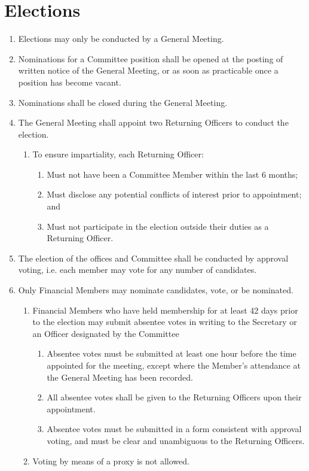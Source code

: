 \documentclass[a4paper]{article}
\begin{document}
\section{Elections} \label{sec:elections}
\begin{enumerate}
    \item Elections may only be conducted by a General Meeting.
    \item Nominations for a Committee position shall be opened at the posting of written notice of the General Meeting, or as soon as practicable once a position has become vacant.
    \item Nominations shall be closed during the General Meeting.
    \item The General Meeting shall appoint two Returning Officers to conduct the election.
    \begin{enumerate}
        \item To ensure impartiality, each Returning Officer:
        \begin{enumerate}
            \item Must not have been a Committee Member within the last 6 months;
            \item Must disclose any potential conflicts of interest prior to appointment; and
            \item Must not participate in the election outside their duties as a Returning Officer.
        \end{enumerate}
    \end{enumerate}
    \item The election of the offices and Committee shall be conducted by approval voting, i.e. each member may vote for any number of candidates.
    \item Only Financial Members may nominate candidates, vote, or be nominated.
        \begin{enumerate}
            \item Financial Members who have held membership for at least 42 days prior to the election may submit absentee votes in writing to the Secretary or an Officer designated by the Committee
            \begin{enumerate}
                \item Absentee votes must be submitted at least one hour before the time appointed for the meeting, except where the Member’s attendance at the General Meeting has been recorded.
                \item All absentee votes shall be given to the Returning Officers upon their appointment.
                \item Absentee votes must be submitted in a form consistent with approval voting, and must be clear and unambiguous to the Returning Officers.
            \end{enumerate}
            \item Voting by means of a proxy is not allowed.
        \end{enumerate}
\end{enumerate}
\end{document}

